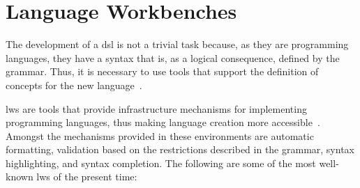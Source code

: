 \section{Language Workbenches}
\label{sec_back:LangWorkbench}

The development of a \ac{dsl} is not a trivial task because, as they are programming languages, they have a syntax that is, as a logical consequence, defined by the grammar.
Thus, it is necessary to use tools that support the definition of concepts for the new language~\cite{Fowler:2005}.

\acp{lw} are tools that provide infrastructure mechanisms for implementing programming languages, thus making language creation more accessible~\cite{Wachsmuth:2014}.
Amongst the mechanisms provided in these environments are automatic formatting, validation based on the restrictions described in the grammar, syntax highlighting, and syntax completion.
The following are some of the most well-known \acp{lw} of the present time:

    
